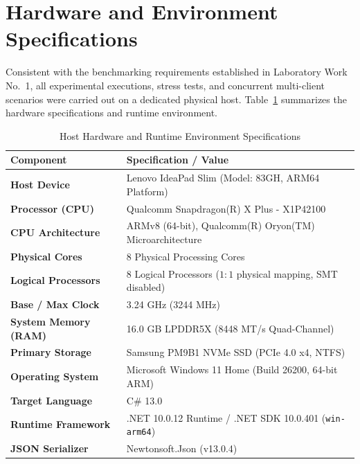 \documentclass[12pt,a4paper]{article}
\begin{document}
\section{Hardware and Environment Specifications}

Consistent with the benchmarking requirements established in Laboratory Work No.~1, all experimental executions, stress tests, and concurrent multi-client scenarios were carried out on a dedicated physical host. Table~\ref{tab:hardware_specs} summarizes the hardware specifications and runtime environment.

\begin{table}[htbp]
\centering
\caption{Host Hardware and Runtime Environment Specifications}
\label{tab:hardware_specs}
\small
\begin{tabularx}{\textwidth}{lX}
\toprule
\textbf{Component} & \textbf{Specification / Value} \\
\midrule
\textbf{Host Device} & Lenovo IdeaPad Slim (Model: 83GH, ARM64 Platform) \\
\textbf{Processor (CPU)} & Qualcomm Snapdragon(R) X Plus - X1P42100 \\
\textbf{CPU Architecture} & ARMv8 (64-bit), Qualcomm(R) Oryon(TM) Microarchitecture \\
\textbf{Physical Cores} & 8 Physical Processing Cores \\
\textbf{Logical Processors} & 8 Logical Processors ($1:1$ physical mapping, SMT disabled) \\
\textbf{Base / Max Clock} & 3.24 GHz (3244 MHz) \\
\textbf{System Memory (RAM)} & 16.0 GB LPDDR5X (8448 MT/s Quad-Channel) \\
\textbf{Primary Storage} & Samsung PM9B1 NVMe SSD (PCIe 4.0 x4, NTFS) \\
\textbf{Operating System} & Microsoft Windows 11 Home (Build 26200, 64-bit ARM) \\
\textbf{Target Language} & C\# 13.0 \\
\textbf{Runtime Framework} & .NET 10.0.12 Runtime / .NET SDK 10.0.401 (\texttt{win-arm64}) \\
\textbf{JSON Serializer} & Newtonsoft.Json (v13.0.4) \\
\bottomrule
\end{tabularx}
\end{table}
\end{document}
